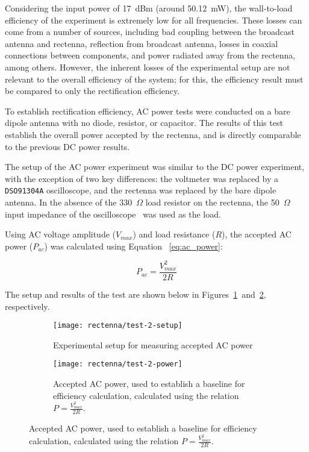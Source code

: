 Considering the input power of 17~dBm (around 50.12~mW), the wall-to-load efficiency of the experiment is extremely low for all frequencies. These losses can come from a number of sources, including bad coupling between the broadcast antenna and rectenna, reflection from broadcast antenna, losses in coaxial connections between components, and power radiated away from the rectenna, among others. However, the inherent losses of the experimental setup are not relevant to the overall efficiency of the system; for this, the efficiency result must be compared to only the rectification efficiency.

To establish rectification efficiency, AC power tests were conducted on a bare dipole antenna with no diode, resistor, or capacitor. The results of this test establish the overall power accepted by the rectenna, and is directly comparable to the previous DC power results.

The setup of the AC power experiment was similar to the DC power experiment, with the exception of two key differences: the voltmeter was replaced by a \texttt{DSO91304A} oscilloscope, and the rectenna was replaced by the bare dipole antenna. In the absence of the 330~$\Omega$ load resistor on the rectenna, the 50~$\Omega$ input impedance of the oscilloscope~\cite{DSO91304A-manual} was used as the load. 

Using AC voltage amplitude ($V_{max}$) and load resistance ($R$), the accepted AC power ($P_{ac}$) was calculated using Equation ~\ref{eq:ac_power}:

\begin{equation}
P_{ac} = \frac{V_{max}^2}{2R}
\label{eq:ac_power}
\end{equation}

The setup and results of the test are shown below in Figures~\ref{fig:rectenna-test-2-setup}~and~\ref{fig:rectenna-test-2-power}, respectively.

\begin{figure}[h!]
    \centering
    \begin{subfigure}{.85\textwidth}
        \centering
        \texttt{[image: rectenna/test-2-setup]}
        \caption{Experimental setup for measuring accepted AC power}
        \label{fig:rectenna-test-2-setup}
    \end{subfigure}
    \begin{subfigure}{.85\textwidth}
        \centering
        \texttt{[image: rectenna/test-2-power]}
        \caption[Accepted AC power]{Accepted AC power, used to establish a baseline for efficiency calculation, calculated using the relation $P = \frac{V_{max}^2}{2R}$.}
        \label{fig:rectenna-test-2-power}
    \end{subfigure}
    \label{fig:rectenna-test-2}
\end{figure}

